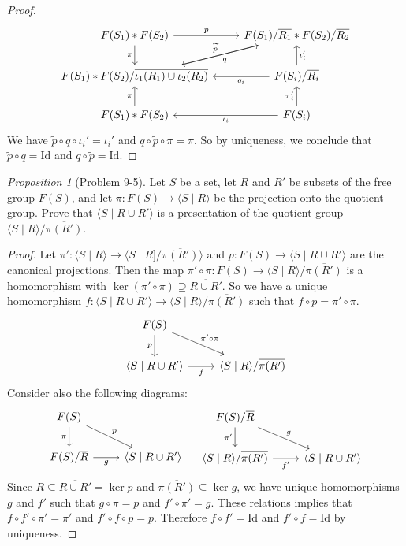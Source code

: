 \documentclass[a4paper]{article}
\theoremstyle{remark}
\newtheorem{prop}{Proposition}
\newcommand{\subhim}{\subseteq} %
\newcommand{\Id}{\text{Id}} %
\newcommand\metric[1]{\langle#1\rangle}
\begin{document}
\begin{proof}
	\[
	\begin{tikzcd}
	F(S_1)* F(S_2) \arrow[r,"p"] \arrow[d,"\pi",swap] &  F(S_1)/\overline{R_1} * F(S_2)/\overline{R_2} \arrow[dl,"q"] \\
	F(S_1)*F(S_2)/\overline{\iota_1(R_1)\cup \iota_2(R_2)} \arrow[ur,"\widetilde{p}"] & F(S_i)/\overline{R_i} \arrow[l,"q_i"] \arrow[u,"\iota_i'",swap] \\
	F(S_1)* F(S_2) \arrow[u,"\pi"] & F(S_i) \arrow[l,"\iota_i"] \arrow[u,"\pi_i'"]
	\end{tikzcd}
	\]
	We have $\widetilde{p} \circ q \circ \iota_i' = \iota_i'$ and $q \circ \widetilde{p} \circ \pi = \pi$. So by uniqueness, we conclude that $\widetilde{p} \circ q = \Id$ and $q \circ \widetilde{p} = \Id$. 
\end{proof}

\begin{prop}[Problem 9-5]
	Let $S$ be a set, let $R$ and $R'$ be subsets of the free group $F(S)$, and let $\pi : F(S) \to \metric{S \mid R}$ be the projection onto the quotient group. Prove that $\metric{S \mid R \cup R'}$ is a presentation of the quotient group $\metric{S \mid R}/\overline{\pi(R')}$.
\end{prop}
\begin{proof}
	Let $\pi' : \metric{S\mid R} \to \metric{S \mid R]/\overline{\pi(R')}}$ and $p : F(S) \to \metric{S \mid R \cup R'}$ are the canonical projections. Then the map $\pi' \circ \pi : F(S) \to \metric{S \mid R}/\overline{\pi(R')}$ is a homomorphism with $\ker (\pi' \circ \pi) \supseteq \overline{R \cup R'}$. So we have a unique homomorphism $f : \metric{S \mid R \cup R'} \to   \metric{S \mid R}/\overline{\pi(R')}$ such that $f \circ p = \pi' \circ \pi$.
	\[
	\begin{tikzcd}
	F(S) \arrow[d,"p",swap] \arrow[dr,"\pi' \circ \pi"] & \\
	\metric{S \mid R \cup R'} \arrow[r,"f",swap] &  \metric{S \mid R}/\overline{\pi(R')} 
	\end{tikzcd}
	\]
	Consider also the following diagrams:
	\[
	\begin{tikzcd}
	F(S) \arrow[d,"\pi",swap] \arrow[dr,"p"] & \\
	F(S)/ \overline{R} \arrow[r,"g",swap] &  \metric{S \mid R \cup R'}
	\end{tikzcd}
	\quad 
	\begin{tikzcd}
	F(S)/ \overline{R} \arrow[d,"\pi'",swap] \arrow[dr,"g"] & \\
	\metric{S \mid R}/\overline{\pi(R')} \arrow[r,"f'",swap] &  \metric{S \mid R \cup R'}
	\end{tikzcd}
	\]
	Since $\overline{R} \subhim \overline{R \cup R'} = \ker p$ and $\overline{\pi(R')} \subhim \ker g$, we have unique homomorphisms $g$ and $f'$ such that $g  \circ \pi = p$ and $f' \circ \pi' = g$. These relations implies that $f \circ f' \circ \pi' = \pi'$ and $f' \circ f \circ p = p$. Therefore $f \circ f' = \Id$ and $f' \circ f = \Id$ by uniqueness.
\end{proof}
\end{document}
